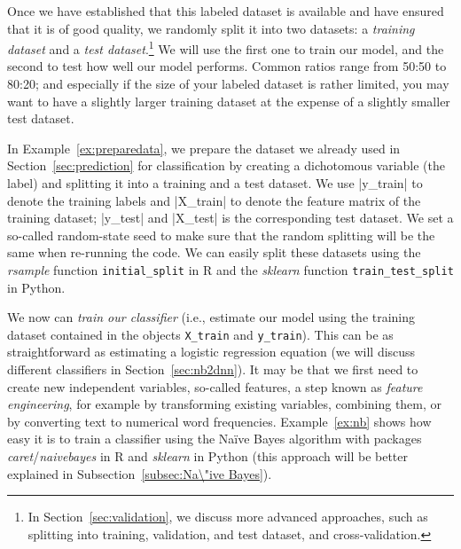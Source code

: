 Once we have established that this labeled dataset is available and
have ensured that it is of good quality, we randomly split it into two
datasets: a \emph{training dataset} and a \emph{test
  dataset}.\footnote{In Section~\ref{sec:validation}, we discuss more
  advanced approaches, such as splitting into training, validation,
  and test dataset, and cross-validation.}  We will use the first one
to train our model, and the second to test how well our model
performs. Common ratios range from 50:50 to 80:20; and especially if
the size of your labeled dataset is rather limited, you may want to
have a slightly larger training dataset at the expense of a slightly
smaller test dataset.

In Example~\ref{ex:preparedata}, we prepare the dataset we already used in
Section~\ref{sec:prediction} for classification by creating a
dichotomous variable (the label) and splitting it into a training and
a test dataset. We use |y_train| to denote the training labels and
|X_train| to denote the feature matrix of the training dataset;
|y_test| and |X_test| is the corresponding test dataset. We set a
so-called random-state seed to make sure that the random splitting
will be the same when re-running the code. We can easily split these datasets using the \emph{rsample} function \texttt{initial\_split} in R and the \emph{sklearn} function \texttt{train\_test\_split} in Python.


We now can \emph{train our classifier} (i.e., estimate our model using the
training dataset contained in the objects \texttt{X\_train} and \texttt{y\_train}). This can be as straightforward as estimating a
logistic regression equation (we will discuss different classifiers in
Section~\ref{sec:nb2dnn}).  It may be that we first need to create new
independent variables, so-called features, a step known as
\emph{feature engineering}, for example by transforming existing
variables, combining them, or by converting text to numerical word
frequencies.
Example~\ref{ex:nb} shows how easy it is to train a classifier using the Na\"ive Bayes algorithm with packages \emph{caret}/\emph{naivebayes} in R and \emph{sklearn} in Python (this approach will be better explained in Subsection~\ref{subsec:Na\"ive Bayes}).



